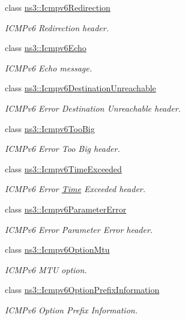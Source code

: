 \begin{DoxyCompactItemize}
class \hyperlink{classns3_1_1Icmpv6Redirection}{ns3\+::\+Icmpv6\+Redirection}
\begin{DoxyCompactList}\small\item\em I\+C\+M\+Pv6 Redirection header. \end{DoxyCompactList}\item 
class \hyperlink{classns3_1_1Icmpv6Echo}{ns3\+::\+Icmpv6\+Echo}
\begin{DoxyCompactList}\small\item\em I\+C\+M\+Pv6 Echo message. \end{DoxyCompactList}\item 
class \hyperlink{classns3_1_1Icmpv6DestinationUnreachable}{ns3\+::\+Icmpv6\+Destination\+Unreachable}
\begin{DoxyCompactList}\small\item\em I\+C\+M\+Pv6 Error Destination Unreachable header. \end{DoxyCompactList}\item 
class \hyperlink{classns3_1_1Icmpv6TooBig}{ns3\+::\+Icmpv6\+Too\+Big}
\begin{DoxyCompactList}\small\item\em I\+C\+M\+Pv6 Error Too Big header. \end{DoxyCompactList}\item 
class \hyperlink{classns3_1_1Icmpv6TimeExceeded}{ns3\+::\+Icmpv6\+Time\+Exceeded}
\begin{DoxyCompactList}\small\item\em I\+C\+M\+Pv6 Error \hyperlink{classns3_1_1Time}{Time} Exceeded header. \end{DoxyCompactList}\item 
class \hyperlink{classns3_1_1Icmpv6ParameterError}{ns3\+::\+Icmpv6\+Parameter\+Error}
\begin{DoxyCompactList}\small\item\em I\+C\+M\+Pv6 Error Parameter Error header. \end{DoxyCompactList}\item 
class \hyperlink{classns3_1_1Icmpv6OptionMtu}{ns3\+::\+Icmpv6\+Option\+Mtu}
\begin{DoxyCompactList}\small\item\em I\+C\+M\+Pv6 M\+TU option. \end{DoxyCompactList}\item 
class \hyperlink{classns3_1_1Icmpv6OptionPrefixInformation}{ns3\+::\+Icmpv6\+Option\+Prefix\+Information}
\begin{DoxyCompactList}\small\item\em I\+C\+M\+Pv6 Option Prefix Information. \end{DoxyCompactList}\item 

\end{DoxyCompactItemize}
